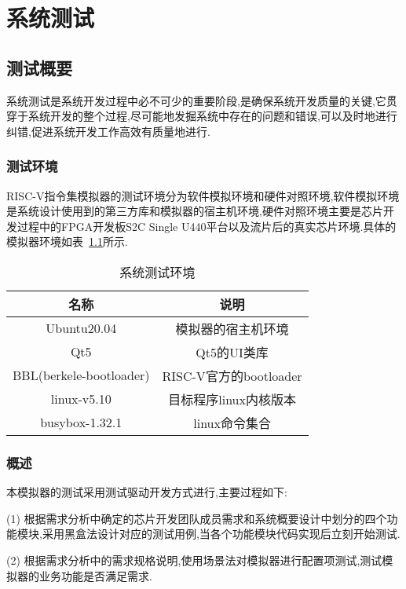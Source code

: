 
\chapter{系统测试}

\section{测试概要}
系统测试是系统开发过程中必不可少的重要阶段,是确保系统开发质量的关键,它贯穿于系统开发的整个过程,尽可能地发掘系统中存在的问题和错误,可以及时地进行纠错,促进系统开发工作高效有质量地进行.

\subsection{测试环境}
RISC-V指令集模拟器的测试环境分为软件模拟环境和硬件对照环境,软件模拟环境是系统设计使用到的第三方库和模拟器的宿主机环境,硬件对照环境主要是芯片开发过程中的FPGA开发板S2C Single U440平台以及流片后的真实芯片环境.具体的模拟器环境如表~\ref{tab:env}所示.
\begin{table}[h]
    \centering
    \caption{系统测试环境}
    \label{tab:env}
    \begin{tabular}{cc}
      \toprule
      名称	& 说明\\
      \midrule
    Ubuntu20.04	& \multicolumn{1}{c}{模拟器的宿主机环境}\\
    Qt5	& \multicolumn{1}{c}{Qt5的UI类库}\\
    BBL(berkele-bootloader)	& \multicolumn{1}{c}{RISC-V官方的bootloader}\\
    linux-v5.10    & \multicolumn{1}{c}{目标程序linux内核版本}\\
    busybox-1.32.1 & \multicolumn{1}{c}{linux命令集合}\\
      \bottomrule
    \end{tabular}
\end{table}


\subsection{概述}
本模拟器的测试采用测试驱动开发方式进行,主要过程如下:


(1) 根据需求分析中确定的芯片开发团队成员需求和系统概要设计中划分的四个功能模块,采用黑盒法设计对应的测试用例,当各个功能模块代码实现后立刻开始测试.


(2) 根据需求分析中的需求规格说明,使用场景法对模拟器进行配置项测试,测试模拟器的业务功能是否满足需求.


